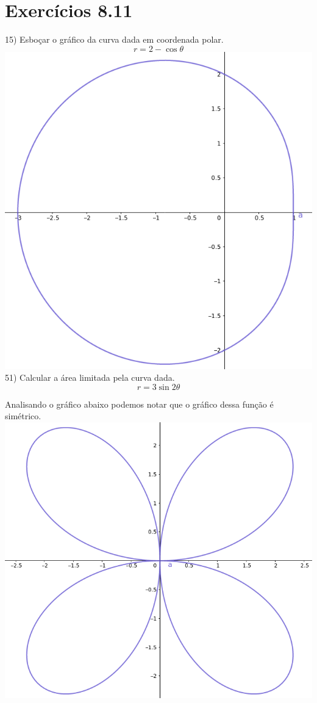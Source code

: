 \documentclass[a4paper,times,12pt]{article}
\begin{document}
\section{Exerc\'{i}cios 8.11}
\hspace*{+15pt} 15) Esboçar o gráfico da curva dada em coordenada polar.
\[
	r=2-\cos\theta
\]
\includegraphics[width=\textwidth]{8-11-15}
\newpage
\hspace*{+15pt} 51) Calcular a área limitada pela curva dada.
\[
	r=3\sin2\theta
\]
\par Analisando o gráfico abaixo podemos notar que o gráfico dessa função é simétrico.
\\
\includegraphics[width=\textwidth]{8-11-51}
\end{document}
